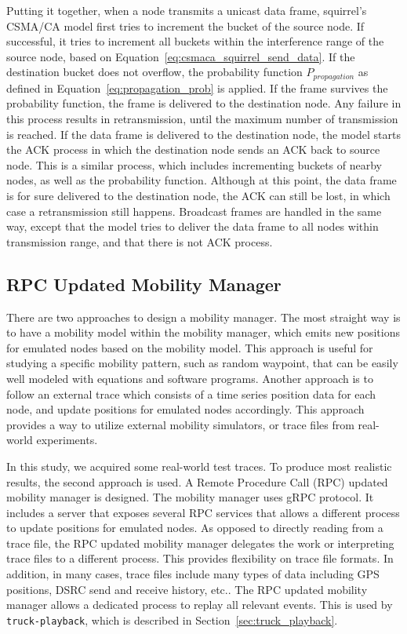 \documentclass[12pt]{report}
\begin{document}
Putting it together, when a node transmits a unicast data frame, squirrel's CSMA/CA model first tries to increment the bucket of the source node. If successful, it tries to increment all buckets within the interference range of the source node, based on Equation~\ref{eq:csmaca_squirrel_send_data}. If the destination bucket does not overflow, the probability function $P_{propagation}$ as defined in Equation~\ref{eq:propagation_prob} is applied. If the frame survives the probability function, the frame is delivered to the destination node. Any failure in this process results in retransmission, until the maximum number of transmission is reached. If the data frame is delivered to the destination node, the model starts the ACK process in which the destination node sends an ACK back to source node. This is a similar process, which includes incrementing buckets of nearby nodes, as well as the probability function. Although at this point, the data frame is for sure delivered to the destination node, the ACK can still be lost, in which case a retransmission still happens. Broadcast frames are handled in the same way, except that the model tries to deliver the data frame to all nodes within transmission range, and that there is not ACK process.


\subsection{RPC Updated Mobility Manager}
\label{sec:rpc_mobility_manager}

There are two approaches to design a mobility manager. The most straight way is to have a mobility model within the mobility manager, which emits new positions for emulated nodes based on the mobility model. This approach is useful for studying a specific mobility pattern, such as random waypoint, that can be easily well modeled with equations and software programs. Another approach is to follow an external trace which consists of a time series position data for each node, and update positions for emulated nodes accordingly. This approach provides a way to utilize external mobility simulators, or trace files from real-world experiments.

In this study, we acquired some real-world test traces. To produce most realistic results, the second approach is used. A Remote Procedure Call (RPC) updated mobility manager is designed. The mobility manager uses gRPC \cite{grpc} protocol. It includes a server that exposes several RPC services that allows a different process to update positions for emulated nodes. As opposed to directly reading from a trace file, the RPC updated mobility manager delegates the work or interpreting trace files to a different process. This provides flexibility on trace file formats. In addition, in many cases, trace files include many types of data including GPS positions, DSRC send and receive history, etc.. The RPC updated mobility manager allows a dedicated process to replay all relevant events. This is used by \texttt{truck-playback}, which is described in Section~\ref{sec:truck_playback}.
\end{document}

